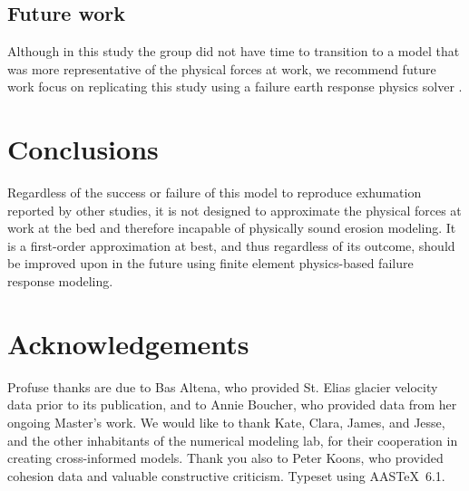 \documentclass[twocolumn]{aastex6}
\begin{document}
	\subsection{Future work}
		Although in this study the group did not have time to transition to a model that was more representative of the physical forces at work, we recommend future work focus on replicating this study using a failure earth response physics solver \citep{Koons2013}.

	\section{Conclusions}
		Regardless of the success or failure of this model to reproduce exhumation reported by other studies, it is not designed to approximate the physical forces at work at the bed and therefore incapable of physically sound erosion modeling. It is a first-order approximation at best, and thus regardless of its outcome, should be improved upon in the future using finite element physics-based failure response modeling.

	\acknowledgements
	\section*{Acknowledgements}
		Profuse thanks are due to Bas Altena, who provided St. Elias glacier velocity data prior to its publication, and to Annie Boucher, who provided data from her ongoing Master's work. We would like to thank Kate, Clara, James, and Jesse, and the other inhabitants of the numerical modeling lab, for their cooperation in creating cross-informed models. Thank you also to Peter Koons, who provided cohesion data and valuable constructive criticism. Typeset using AAS\TeX\ 6.1.

	
	
\end{document}
